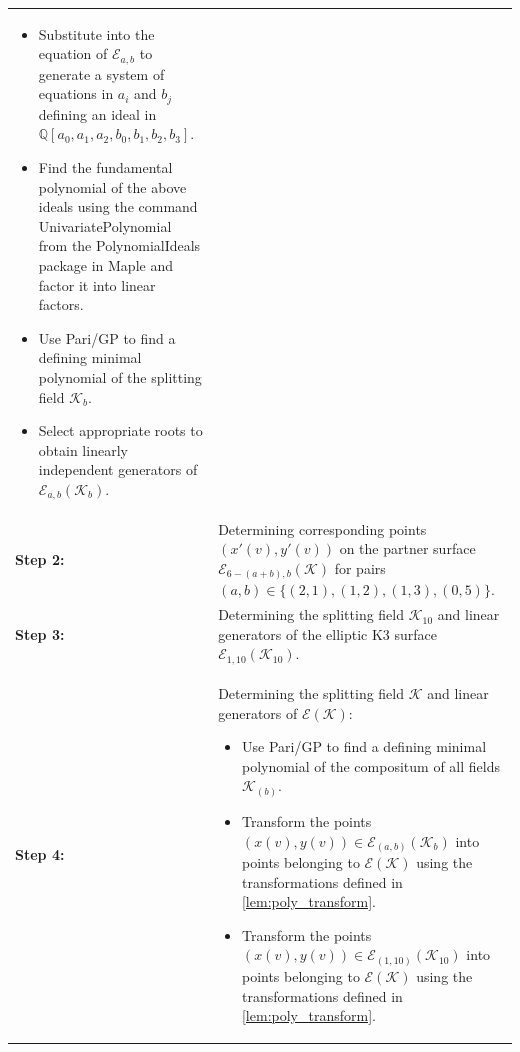 \documentclass[11pt]{amsart}
\begin{document}
\begin{table}[htbp]
\begin{tabularx}{\textwidth}{@{} l X @{}}
\begin{itemize}[leftmargin=*, nosep, topsep=2pt]
			$(x(v), y(v)) = (a_0 + a_1 v + a_2 v^2, b_0 + b_1 v + b_2 v^2 + b_3 v^3)$.
			\item Substitute into the equation of $\mathcal{E}_{a,b}$ to generate a system of equations in $a_i$ and $b_j$ defining an ideal in $\mathbb{Q}[a_0, a_1, a_2, b_0, b_1, b_2, b_3]$.
			\item Find the fundamental polynomial of the above ideals using the command \textsf{UnivariatePolynomial} from the \textsf{PolynomialIdeals} package in \textsf{Maple} and factor it into linear factors.
			\item Use \textsf{Pari/GP} to find a defining minimal polynomial  of the splitting field $\mathcal{K}_{b}$.
			\item Select appropriate roots to obtain linearly independent generators of $\mathcal{E}_{a,b}(\mathcal{K}_{b})$.
		\end{itemize} \\
		\addlinespace
		\textbf{Step 2:} & Determining corresponding points $(x'(v), y'(v))$ on the partner surface 
		$\mathcal{E}_{6-(a+b), b}(\mathcal{K})$ for pairs $(a,b) \in \{ (2, 1), (1,2), (1, 3), (0, 5) \}.$ \\
		\addlinespace
		\textbf{Step 3:} & Determining the splitting field $\mathcal{K}_{10}$ and linear generators of the elliptic K3 surface $\mathcal{E}_{1,10}(\mathcal{K}_{10})$.\\
		\textbf{Step 4:} & Determining the splitting field $\mathcal{K}$ and linear generators of $\mathcal{E}(\mathcal{K})$:
		\begin{itemize}[leftmargin=*, nosep, topsep=2pt]
			\item Use \textsf{Pari/GP} to find a defining minimal polynomial of the compositum of all fields $\mathcal{K}_{(b)}$.
			\item Transform the points $(x(v), y(v)) \in \mathcal{E}_{(a,b)}(\mathcal{K}_{b})$ into points belonging to $\mathcal{E}(\mathcal{K})$ using the transformations defined in \ref{lem:poly_transform}.
				\item Transform the points $(x(v), y(v)) \in \mathcal{E}_{(1,10)}(\mathcal{K}_{10})$ into points belonging to $\mathcal{E}(\mathcal{K})$ using the transformations defined in \ref{lem:poly_transform}.
		\end{itemize} \\
		\bottomrule
	\end{tabularx}
\end{table}

 
 
\iffalse
\end{document}
